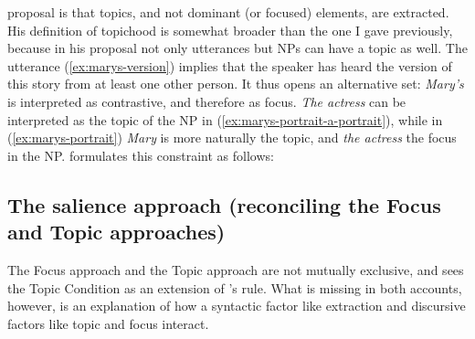  proposal is that topics, and not dominant (or focused) elements, are extracted. His definition of topichood is somewhat broader than the one I gave previously, because in his proposal not only utterances but NPs can have a topic as well. 
The utterance (\ref{ex:marys-version}) implies that the speaker has heard the version of this story from at least one other person. It thus opens an alternative set: \emph{Mary's} is interpreted as contrastive, and therefore as focus. \emph{The actress} can be interpreted as the topic of the NP in (\ref{ex:marys-portrait-a-portrait}), while in (\ref{ex:marys-portrait}) \emph{Mary} is more naturally the topic, and \emph{the actress} the focus in the NP. 
\citeauthor{Kuno.1987} formulates this constraint as follows:

\z 


\subsection{The salience approach (reconciling the Focus and Topic approaches)}
\label{ch:salience-and-BCI}\largerpage[-2]

The Focus approach and the Topic approach are not mutually exclusive, and \citet{Kuno.1987} sees the Topic Condition as an extension of \citeauthor{Erteschik-Shir.1973}'s rule. What is missing in both accounts, however, is an explanation of how a syntactic factor like extraction and discursive factors like topic and focus interact. 

